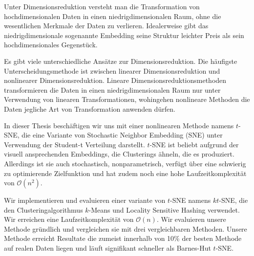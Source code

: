 Unter Dimensionsreduktion versteht man die Transformation von hochdimensionalen
Daten in einen niedrigdimensionalen Raum, ohne die wesentlichen Merkmale der Daten
zu verlieren. Idealerweise gibt das niedrigdimensionale sogenannte Embedding seine
Struktur leichter Preis als sein hochdimensionales Gegenstück.

Es gibt viele unterschiedliche Ansätze zur Dimensionsreduktion. Die häufigste Unterscheidungsmethode
ist zwischen linearer Dimensionsreduktion und nonlinearer Dimensionsreduktion. Lineare
Dimensionsreduktionsmethoden transformieren die Daten in einen niedrigdimensionalen Raum
nur unter Verwendung von linearen Transformationen, wohingehen nonlineare Methoden die
Daten jegliche Art von Transformation anwenden dürfen.

In dieser Thesis beschäftigen wir uns mit einer nonlinearen Methode namens $t$-SNE, die
eine Variante von Stochastic Neighbor Embedding (SNE) unter Verwendung der Student-t Verteilung
darstellt. $t$-SNE ist beliebt aufgrund der visuell ansprechenden Embeddings, die Clusterings
ähneln, die es produziert. Allerdings ist sie auch stochastisch, nonparametrisch, verfügt
über eine schwierig zu optimierende Zielfunktion und hat zudem noch eine hohe Laufzeitkomplexität
von $\mathcal{O}(n^2)$.

Wir implementieren und evaluieren einer variante von $t$-SNE namens $kt$-SNE,
die den Clusteringalgorithmus $k$-Means und Locality Sensitive Hashing
verwendet. Wir erreichen eine Laufzeitkomplexität von $\mathcal{O}(n)$. Wir
evaluieren unsere Methode gründlich und vergleichen sie mit drei vergleichbaren
Methoden. Unsere Methode erreicht Resultate die zumeist innerhalb von 10\% der
besten Methode auf realen Daten liegen und läuft signifikant schneller als
Barnes-Hut $t$-SNE.

